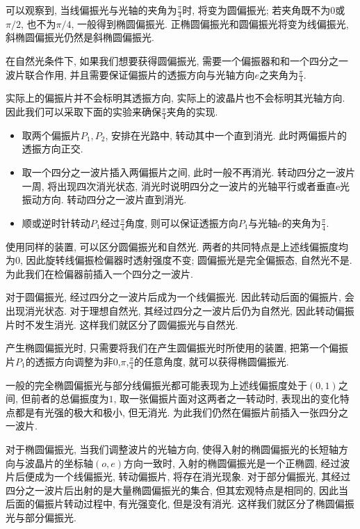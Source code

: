 可以观察到, 当线偏振光与光轴的夹角为$\frac{\pi}{4}$时, 将变为圆偏振光; 若夹角既不为$0$或$\pi/2$, 也不为$\pi/4$, 一般得到椭圆偏振光. 正椭圆偏振光和圆偏振光将变为线偏振光, 斜椭圆偏振光仍然是斜椭圆偏振光.


在自然光条件下, 如果我们想要获得圆偏振光, 需要一个偏振器和和一个四分之一波片联合作用, 并且需要保证偏振片的透振方向与光轴方向$e$之夹角为$\frac{\pi}{4}$.

\begin{noteenv}
    实际上的偏振片并不会标明其透振方向, 实际上的波晶片也不会标明其光轴方向. 因此我们可以采取下面的实验来确保$\frac{\pi}{4}$夹角的实现.
    \begin{itemize}
        \item 取两个偏振片$P_1,P_2$, 安排在光路中, 转动其中一个直到消光. 此时两偏振片的透振方向正交.
        \item 取一个四分之一波片插入两偏振片之间, 此时一般不再消光. 转动四分之一波片一周, 将出现四次消光状态, 消光时说明四分之一波片的光轴平行或者垂直e光振动方向. 转动四分之一波片直到消光.
        \item 顺或逆时针转动$P_1$经过$\frac{\pi}{4}$角度, 则可以保证透振方向$P_1$与光轴$e$的夹角为$\frac{\pi}{4}$.
    \end{itemize}
\end{noteenv}

使用同样的装置, 可以区分圆偏振光和自然光. 两者的共同特点是上述线偏振度均为0, 因此旋转线偏振检偏器时透射强度不变; 圆偏振光是完全偏振态, 自然光不是. 为此我们在检偏器前插入一个四分之一波片.

对于圆偏振光, 经过四分之一波片后成为一个线偏振光. 因此转动后面的偏振片, 会出现消光状态. 对于理想自然光, 其经过四分之一波片后仍为自然光, 因此转动偏振片时不发生消光. 这样我们就区分了圆偏振光与自然光.

产生椭圆偏振光时, 只需要将我们在产生圆偏振光时所使用的装置, 把第一个偏振片$P_1$的透振方向调整为非0,$\pi$,$\frac{\pi}{4}$的任意角度, 就可以获得椭圆偏振光.

一般的完全椭圆偏振光与部分线偏振光都可能表现为上述线偏振度处于$(0,1)$之间, 但前者的总偏振度为$1$, 取一张偏振片面对这两者之一转动时, 表现出的变化特点都是有光强的极大和极小, 但无消光. 为此我们仍然在偏振片前插入一张四分之一波片.

对于椭圆偏振光, 当我们调整波片的光轴方向, 使得入射的椭圆偏振光的长短轴方向与波晶片的坐标轴$(o,e)$方向一致时, 入射的椭圆偏振光是一个正椭圆, 经过波片后便成为一个线偏振光, 转动偏振片, 将存在消光现象. 对于部分偏振光, 其经过四分之一波片后出射的是大量椭圆偏振光的集合, 但其宏观特点是相同的, 因此当后面的偏振片转动过程中, 有光强变化, 但是没有消光. 这样我们就区分了椭圆偏振光与部分偏振光.

